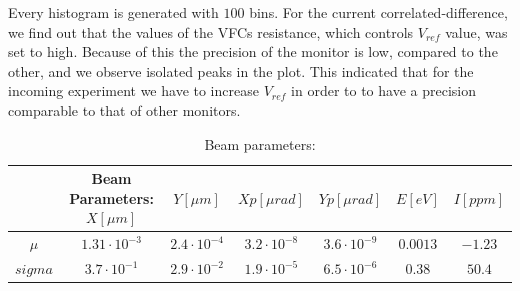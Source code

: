 \begin{figure}
\end{figure}

Every histogram is generated with $100$ bins. For the current correlated-difference, we find out that the values of the VFCs resistance, which controls $V_{ref}$ value, was set to high. Because of this the precision of the monitor is low, compared to the other, and we observe isolated peaks in the plot. This indicated that for the incoming experiment we have to increase $V_{ref}$ in order to to have a precision comparable to that of other monitors. 


\begin{table} 
\centering
\caption{Beam parameters:}
\begin{tabular}{c|c|c|c|c|c|c} 
\hline 
\rule[-1ex]{0pt}{2.5ex} & Beam Parameters: $X [\mu m]$ & $Y[\mu m]$ & $Xp [\mu rad]$ & $Yp [\mu rad]$ & $E [eV]$ & $I [ppm] $ \\ 
\hline 
\rule[-1ex]{0pt}{2.5ex} $\mu$ & $1.31 \cdot 10^{-3}$ & $2.4 \cdot 10^{-4}$ & $3.2 \cdot 10^{-8} $ & $3.6 \cdot 10^{-9}$ & $0.0013$ & $-1.23$ \\ 
\hline 
\rule[-1ex]{0pt}{2.5ex} $sigma$ & $3.7 \cdot 10^{-1}$ & $2.9 \cdot 10^{-2}$ & $ 1.9 \cdot 10^{-5} $ & $6.5 \cdot 10^{-6}$ & $0.38$  & $50.4$ \\ 
\hline 
\end{tabular}
\label{Tab:parametri} 
\end{table}


